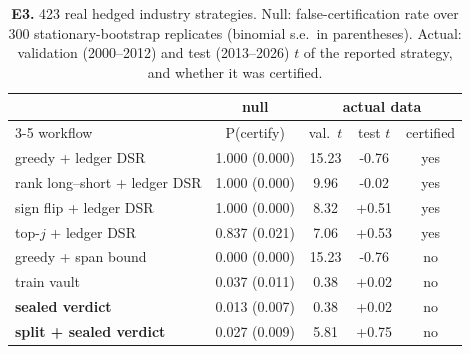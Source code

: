 \begin{table}[t]\centering\small
\caption{\textbf{E3.} 423 real hedged industry strategies. Null: false-certification rate over 300 stationary-bootstrap replicates (binomial s.e.\ in parentheses). Actual: validation (2000--2012) and test (2013--2026) $t$ of the reported strategy, and whether it was certified.}\label{tab:e3}
\begin{tabular}{l c ccc}\toprule
 & null & \multicolumn{3}{c}{actual data}\\\cmidrule(lr){3-5}
workflow & P(certify) & val.\ $t$ & test $t$ & certified\\\midrule
greedy + ledger DSR & 1.000 (0.000) & 15.23 & -0.76 & yes\\
rank long--short + ledger DSR & 1.000 (0.000) & 9.96 & -0.02 & yes\\
sign flip + ledger DSR & 1.000 (0.000) & 8.32 & +0.51 & yes\\
top-$j$ + ledger DSR & 0.837 (0.021) & 7.06 & +0.53 & yes\\
\midrule
greedy + span bound & 0.000 (0.000) & 15.23 & -0.76 & no\\
train vault & 0.037 (0.011) & 0.38 & +0.02 & no\\
\textbf{sealed verdict} & 0.013 (0.007) & 0.38 & +0.02 & no\\
\textbf{split + sealed verdict} & 0.027 (0.009) & 5.81 & +0.75 & no\\
\bottomrule\end{tabular}\end{table}
